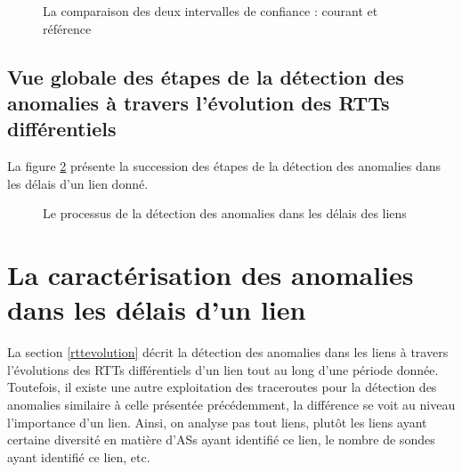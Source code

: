 \begin{figure}[h]
	\centering
	\captionsetup{justification=centering}
	\resizebox{\textwidth}{!}{
		
	}
	\caption{La comparaison des deux intervalles de confiance : courant et référence }
	\label{fig:intervals-comparaison}
\end{figure}

\subsection{Vue globale des étapes de la détection des anomalies à travers l'évolution des RTTs différentiels}
La figure 	\ref{fig:process-rttanalysis_tex} présente la succession des étapes de la détection des anomalies dans les délais d'un lien donné. 

\begin{figure}[h]
	\centering
	\resizebox{\textwidth}{\textheight}{
		
	}
	\caption{Le processus de la détection des anomalies dans les délais des liens}
	\label{fig:process-rttanalysis_tex}
\end{figure}



\section{La caractérisation des anomalies dans les délais d'un lien}
La section \ref{rttevolution} décrit la détection des anomalies dans les liens à travers l'évolutions des RTTs différentiels d'un lien tout au long d'une période donnée. Toutefois, il existe une autre exploitation des traceroutes pour la détection des anomalies similaire à celle présentée précédemment, la différence se voit au niveau l'importance d'un lien. Ainsi, on analyse pas tout liens, plutôt les liens ayant certaine diversité en matière d'ASs ayant identifié ce lien, le nombre de sondes ayant identifié ce lien, etc. 
